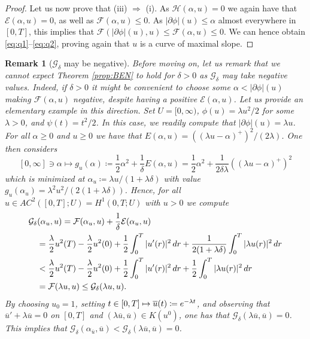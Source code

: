 \documentclass[10pt,a4paper]{amsart}
\newcommand{\dr}{{\rm d} r}
\newcommand{\ove}{\overline}
\renewcommand{\sl}{|\partial \phi|}
\newcommand{\GG}{{\mathcal G}}
\newcommand{\EE}{{\mathcal E}}
\newcommand{\FF}{{\mathcal F}}
\newcommand{\HH}{{\mathcal H}}
\newtheorem{remark}[theorem]{Remark}
\begin{document}
\begin{proof}
   Let us now prove that (iii) $\Rightarrow$ (i). As
  $\HH(\alpha,u)=0$ we again have that $  \EE(\alpha,u)=0$, as well as
  $\FF(\alpha,u) \leq 0$. As $  \sl(u)\leq \alpha$ almost everywhere in $[0,T]$, this implies that  
  $\FF(\sl(u),u)\leq \FF(\alpha,u) \leq 0$. We can hence  obtain 
  \eqref{eq:q1}--\eqref{eq:q2}, proving again that $u$ is a curve of
  maximal slope. 
\end{proof}


\begin{remark}[$\GG_\delta$ may be negative]
  Before moving on, let us remark that we cannot expect  Theorem
   \ref{prop:BEN} to hold for $\delta>0$ as $\GG_\delta$ may take
  negative values. Indeed, if $\delta >0$ it might be convenient to
  choose some $\alpha<\sl(u)$ making $\FF(\alpha,u)$ negative, despite
   having  a positive $\EE(\alpha,u)$. Let us provide an
  elementary example in this direction. Set $U=[0,\infty)$,
  $\phi(u) = \lambda u^2/2$ for some $\lambda >0$, and
  $\psi(t) = t^2/2$. In this case, we readily compute that
  $\sl(u) =\lambda u$. For all $\alpha \geq 0$ and $ u \geq 0$ we 
  have  that
  $ E(\alpha, u) = ((\lambda u - \alpha)^+)^2/(2\lambda)$. One then
  considers
$$ [0,\infty] \ni \alpha  \mapsto g_{ u}( \alpha)\coloneqq\frac12 \alpha^2 +
\frac{1}{\delta} E(\alpha, u) = \frac12 \alpha^2 +
\frac{1}{2\delta\lambda }((\lambda u - \alpha)^+)^2$$ which is
minimized at $ \alpha_{ u} \coloneqq \lambda u/ (1+ \lambda \delta)$
with value
$g_{ u}( \alpha_{ u}) = \lambda^2 u^2/(2(1+\lambda \delta)) $. Hence,
for all $ u \in AC^2([0,T];U) = H^1(0,T;U)$ with $ u>0$ we compute
\begin{align*}
  & \GG_\delta( \alpha_{ u}, u) = \FF(\alpha_{
    u}, u)+\frac{1}{\delta}\EE( \alpha_{ u}, u) \\
  &\quad=
    \frac{\lambda}{2}u^2(T) -  \frac{\lambda}{2}u^2(0) +
    \frac12\int_0^T | u'(r)|^2\, \dr +
    \frac{1}{ 2(1+\lambda\delta)}\int_0^T |\lambda  u(r)|^2\,
    \dr\nonumber\\
  &\quad <  \frac{\lambda}{2}u^2(T) -  \frac{\lambda}{2}u^2(0) +
    \frac12\int_0^T | u'(r)|^2\, \dr +
    \frac{1}{2}\int_0^T |\lambda  u(r)|^2\,
    \dr \nonumber\\
  &\quad =\FF(\lambda  u, u)\leq \GG_\delta (\lambda 
    u, u).
\end{align*}
By choosing $u_0=1$, setting
$t\in [0,T]\mapsto \ove u(t) \coloneqq {\rm e}^{-\lambda t}$, and
observing that $\ove u '+\lambda \ove u=0$  on $[0,T]$  and
$(\lambda \ove u ,\ove u)\in K(u^0)$, one has that
$\GG_\delta(\lambda \ove u ,\ove u)=0$. This implies that
$\GG_\delta(\alpha_{\ove u}, \ove u)<\GG_\delta(\lambda \ove u ,\ove
u)=0$.
\end{remark}
\end{document}

